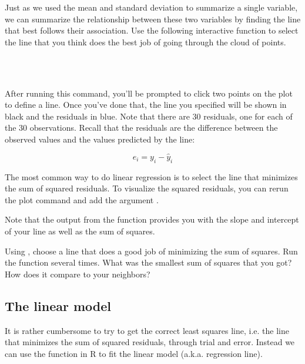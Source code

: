 \documentclass[11pt]{article}
\begin{document}
Just as we used the mean and standard deviation to summarize a single variable, we can summarize the relationship between these two variables by finding the line that best follows their association.  Use the following interactive function to select the line that you think does the best job of going through the cloud of points.

\ttfamily\noindent
\hlstd{}\hspace*{\fill}\\
\hlstd{}\hlkeyword{(}\hlargument{=}{\ }\hlkeyword{\usebox{\hlnormalsizeboxdollar}}\hlkeyword{,}{\ }\hlargument{=}{\ }\hlkeyword{\usebox{\hlnormalsizeboxdollar}}\hlkeyword{)}\hspace*{\fill}\\
\normalfont

After running this command, you'll be prompted to click two points on the plot to define a line.  Once you've done that, the line you specified will be shown in black and the residuals in blue.  Note that there are 30 residuals, one for each of the 30 observations. Recall that the residuals are the difference between the observed values and the values predicted by the line:

\[ e_i = y_i - \hat{y}_i \]

The most common way to do linear regression is to select the line that minimizes the sum of squared residuals.  To visualize the squared residuals, you can rerun the plot command and add the argument \texttt{\hlargument{=}{\ }}.

Note that the output from the \texttt{} function provides you with the slope and intercept of your line as well as the sum of squares.

\begin{exercise}
Using \texttt{}, choose a line that does a good job of minimizing the sum of squares.  Run the function several times.  What was the smallest sum of squares that you got?  How does it compare to your neighbors?
\end{exercise}

\subsection*{The linear model}

It is rather cumbersome to try to get the correct least squares line, i.e. the line that minimizes the sum of squared residuals, through trial and error. Instead we can use the \texttt{} function in R to fit the linear model (a.k.a. regression line).
\end{document}
